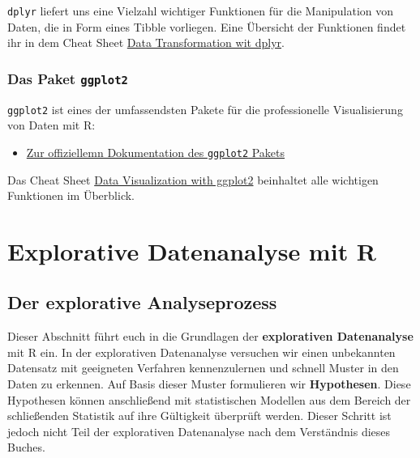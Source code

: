\documentclass[
]{book}
\providecommand{\tightlist}{%
  \setlength{\itemsep}{0pt}\setlength{\parskip}{0pt}}
\begin{document}
\texttt{dplyr} liefert uns eine Vielzahl wichtiger Funktionen für die Manipulation von Daten, die in Form eines Tibble vorliegen. Eine Übersicht der Funktionen findet ihr in dem Cheat Sheet \href{https://raw.githubusercontent.com/rstudio/cheatsheets/main/data-transformation.pdf}{Data Transformation wit dplyr}.

\hypertarget{das-paket-ggplot2}{%
\section{\texorpdfstring{Das Paket \texttt{ggplot2}}{Das Paket ggplot2}}\label{das-paket-ggplot2}}

\texttt{ggplot2} ist eines der umfassendsten Pakete für die professionelle Visualisierung von Daten mit R:

\begin{itemize}
\tightlist
\item
  \href{https://ggplot2.tidyverse.org/}{Zur offiziellemn Dokumentation des \texttt{ggplot2} Pakets}
\end{itemize}

Das Cheat Sheet \href{https://raw.githubusercontent.com/rstudio/cheatsheets/main/data-visualization.pdf}{Data Visualization with ggplot2} beinhaltet alle wichtigen Funktionen im Überblick.

\hypertarget{part-explorative-datenanalyse-mit-r}{%
\part*{Explorative Datenanalyse mit R}\label{part-explorative-datenanalyse-mit-r}}

\hypertarget{der-explorative-analyseprozess}{%
\chapter{Der explorative Analyseprozess}\label{der-explorative-analyseprozess}}

Dieser Abschnitt führt euch in die Grundlagen der \textbf{explorativen Datenanalyse} mit R ein. In der explorativen Datenanalyse versuchen wir einen unbekannten Datensatz mit geeigneten Verfahren kennenzulernen und schnell Muster in den Daten zu erkennen. Auf Basis dieser Muster formulieren wir \textbf{Hypothesen}. Diese Hypothesen können anschließend mit statistischen Modellen aus dem Bereich der schließenden Statistik auf ihre Gültigkeit überprüft werden. Dieser Schritt ist jedoch nicht Teil der explorativen Datenanalyse nach dem Verständnis dieses Buches.
\end{document}
